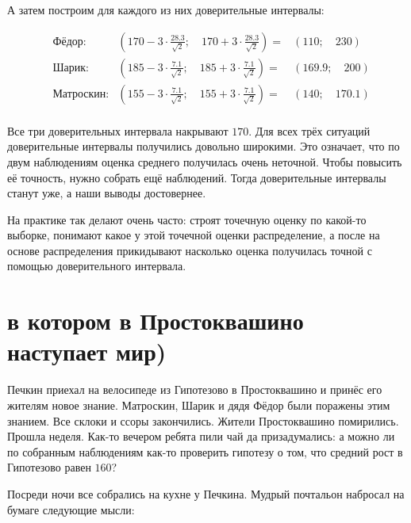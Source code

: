 \documentclass[12pt, a4paper, oneside]{article}
\begin{document}
\begin{sol}
А затем построим для каждого из них  доверительные интервалы: 

\begin{equation*} 
\begin{aligned} 
& \text{Фёдор:}  & \left( 170 -  3 \cdot \frac{28.3}{\sqrt{2}}; \quad 170 + 3 \cdot \frac{28.3}{\sqrt{2}} \right) = &  (110; \quad 230) \\
& \text{Шарик:}  &  \left( 185 -  3 \cdot \frac{7.1}{\sqrt{2}}; \quad 185 + 3 \cdot \frac{7.1}{\sqrt{2}} \right) = &  (169.9; \quad 200) \\
& \text{Матроскин:} &  \left( 155 -  3 \cdot \frac{7.1}{\sqrt{2}}; \quad 155 + 3 \cdot \frac{7.1}{\sqrt{2}} \right) = &  (140; \quad 170.1) \\
\end{aligned}
\end{equation*}

Все три доверительных интервала накрывают $170$.  Для всех трёх ситуаций доверительные интервалы получились довольно широкими. Это означает, что по двум наблюдениям оценка среднего получилась очень неточной. Чтобы повысить её точность, нужно собрать ещё наблюдений. Тогда доверительные интервалы станут уже, а наши выводы достовернее.

На практике так делают очень часто: строят точечную оценку по какой-то выборке, понимают какое у этой точечной оценки распределение, а после на основе распределения прикидывают насколько оценка получилась точной с помощью доверительного интервала.
\end{sol} 

\section{в котором в Простоквашино наступает мир)}
Печкин приехал на велосипеде из Гипотезово в Простоквашино и принёс его жителям новое знание. Матроскин, Шарик и дядя Фёдор были поражены этим знанием. Все склоки и ссоры закончились. Жители Простоквашино помирились. Прошла неделя. Как-то вечером ребята пили чай да призадумались: а можно ли по собранным наблюдениям как-то проверить гипотезу о том, что средний рост в Гипотезово равен $160$?

Посреди ночи все собрались на кухне у Печкина. Мудрый почтальон набросал на бумаге следующие мысли: 
\end{document}

